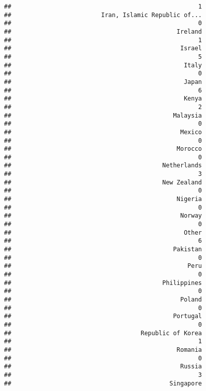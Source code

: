 \documentclass[
]{article}
\begin{document}
\begin{verbatim}
##                                                    1 
##                         Iran, Islamic Republic of... 
##                                                    0 
##                                              Ireland 
##                                                    1 
##                                               Israel 
##                                                    5 
##                                                Italy 
##                                                    0 
##                                                Japan 
##                                                    6 
##                                                Kenya 
##                                                    2 
##                                             Malaysia 
##                                                    0 
##                                               Mexico 
##                                                    0 
##                                              Morocco 
##                                                    0 
##                                          Netherlands 
##                                                    3 
##                                          New Zealand 
##                                                    0 
##                                              Nigeria 
##                                                    0 
##                                               Norway 
##                                                    0 
##                                                Other 
##                                                    6 
##                                             Pakistan 
##                                                    0 
##                                                 Peru 
##                                                    0 
##                                          Philippines 
##                                                    0 
##                                               Poland 
##                                                    0 
##                                             Portugal 
##                                                    0 
##                                    Republic of Korea 
##                                                    1 
##                                              Romania 
##                                                    0 
##                                               Russia 
##                                                    3 
##                                            Singapore 

\end{verbatim}
\end{document}
